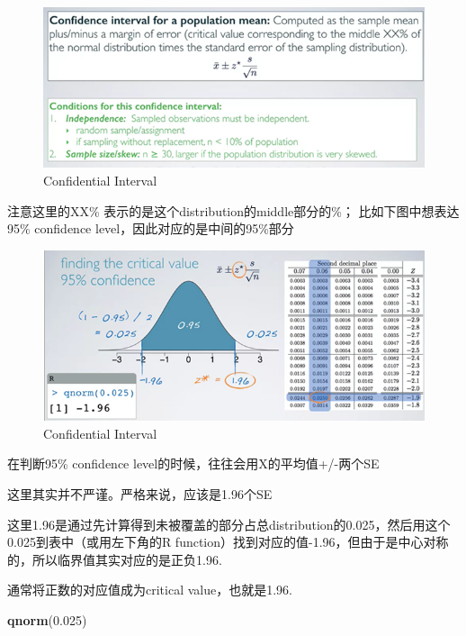 \documentclass[]{book}
\newenvironment{Shaded}{\begin{snugshade}}{\end{snugshade}}
\newcommand{\KeywordTok}[1]{\textcolor[rgb]{0.13,0.29,0.53}{\textbf{#1}}}
\newcommand{\FloatTok}[1]{\textcolor[rgb]{0.00,0.00,0.81}{#1}}
\newcommand{\NormalTok}[1]{#1}
\begin{document}
\begin{figure}

{\centering \includegraphics[width=0.8\linewidth]{graphs/2-6} 

}

\caption{Confidential Interval}\label{fig:fig2-6}
\end{figure}

注意这里的XX\% 表示的是这个distribution的middle部分的\%；
比如下图中想表达95\% confidence level，因此对应的是中间的95\%部分

\begin{figure}

{\centering \includegraphics[width=0.8\linewidth]{graphs/2-7} 

}

\caption{Confidential Interval}\label{fig:fig2-7}
\end{figure}

在判断95\% confidence level的时候，往往会用X的平均值+/-两个SE

这里其实并不严谨。严格来说，应该是1.96个SE

这里1.96是通过先计算得到未被覆盖的部分占总distribution的0.025，然后用这个0.025到表中（或用左下角的R
function）找到对应的值-1.96，但由于是中心对称的，所以临界值其实对应的是正负1.96.

通常将正数的对应值成为critical value，也就是1.96.

\begin{Shaded}
\begin{Highlighting}[]
\KeywordTok{qnorm}\NormalTok{(}\FloatTok{0.025}\NormalTok{)}
\end{Highlighting}
\end{Shaded}
\end{document}
